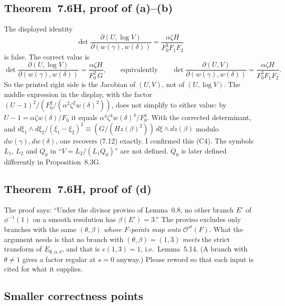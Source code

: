 \documentclass[12pt,letterpaper]{amsart}
\begin{document}
\subsection{Theorem~7.6H, proof of (a)--(b)}

The displayed identity
\[
\det\frac{\partial(U,\log V)}{\partial(w(\gamma),w(\delta))}
=\frac{\alpha\zeta H}{F_0^3F_1F_2}
\]
is false. The correct value is
\[
\det\frac{\partial(U,\log V)}{\partial(w(\gamma),w(\delta))}
=\frac{\alpha\zeta H}{F_0^2\,G},
\qquad\text{equivalently}\qquad
\det\frac{\partial(U,V)}{\partial(w(\gamma),w(\delta))}
=\frac{\alpha\zeta H}{F_0^3F_1F_2}.
\]
So the printed right side is the Jacobian of $(U,V)$, not of $(U,\log V)$. The
middle expression in the display, with the factor
$(U-1)^2/(F_0^2/(\alpha^2\zeta^2w(\delta)^2))$, does not simplify to either
value: by $U-1=\alpha\zeta w(\delta)/F_0$ it equals
$\alpha^4\zeta^4w(\delta)^4/F_0^4$. With the corrected determinant, and
$d\xi_1\wedge d\xi_2/(\xi_1-\xi_2)^2\equiv (G/(Hz(\beta)^2))\,d\xi\wedge dz(\beta)$
modulo $dw(\gamma),dw(\delta)$, one recovers (7.12) exactly. I
confirmed this (C4). The symbols $L_1$, $L_2$ and $Q_0$ in ``$V=L_2/(L_1Q_0)$''
are not defined. $Q_0$ is later defined differently in Proposition~8.3G.

\subsection{Theorem~7.6H, proof of (d)}

The proof says: ``Under the divisor proviso of Lemma~0.8, no other branch $E'$
of $\phi^{-1}(1)$ on a smooth resolution has $\beta(E')=3$.'' The proviso
excludes only branches with the same $(\theta,\beta)$ \emph{whose $F$-points
map onto $\mathcal O^{st}(F)$}. What the argument needs is that no branch with
$(\theta,\beta)=(1,3)$ \emph{meets} the strict transform of
$E_{\emptyset,\alpha,\delta}$, and that is $e(1,3)=1$, i.e.\ Lemma~5.14. (A
branch with $\theta\neq1$ gives a factor regular at $s=0$ anyway.) Please
reword so that each input is cited for what it supplies.

\subsection{Smaller correctness points}\label{sec:minor-correct}
\end{document}
